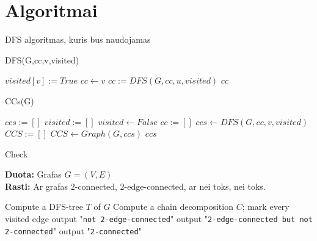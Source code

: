 \documentclass[bibliography=totoc]{article}
\begin{document}
\newpage
\section{Algoritmai}

DFS algoritmas, kuris bus naudojamas
\begin{algorithm}[h]\citep{CormenIntoAlg}
    \caption{DFS(G,cc,v,visited)}
    \begin{algorithmic}[1]
        \STATE $visited[v] := True$
        \STATE $cc\leftarrow v$
                \STATE $cc := DFS(G,cc,u,visited)$
            \ENDIF
        \ENDFOR
        \RETURN $cc$
    \end{algorithmic}
\end{algorithm}    

\begin{algorithm}[h]\citep{CormenIntoAlg}
    \caption{CCs(G)}
    \begin{algorithmic}[1]
        \STATE $ccs := []$
        \STATE $visited := []$
            \STATE $visited \leftarrow False$
        \ENDFOR
                \STATE $cc := []$
                \STATE $ccs \leftarrow DFS(G,cc,v,visited)$
            \ENDIF
        \ENDFOR
        \STATE $CCS := []$
            \STATE $CCS\leftarrow Graph(G,ccs)$
        \ENDFOR
        \RETURN $ccs$
    \end{algorithmic}
\end{algorithm}

\begin{algorithm}[h]\citep{schmidt2013simple}
    \caption{Check}
    \textbf{Duota:} Grafas $G=(V,E)$\\
    \textbf{Rasti:} Ar grafas 2-connected, 2-edge-connected, ar nei toks, nei toks.

    \begin{algorithmic}[1]
        \STATE Compute a DFS-tree $T$ of $G$
        \STATE Compute a chain decomposition $C$; mark every visited edge
            \STATE output "\texttt{not 2-edge-connected}"
            \STATE output "\texttt{2-edge-connected but not 2-connected}"
        \ELSE
            \STATE output "\texttt{2-connected}"
        \ENDIF
    \end{algorithmic}
\end{algorithm}
\end{document}
